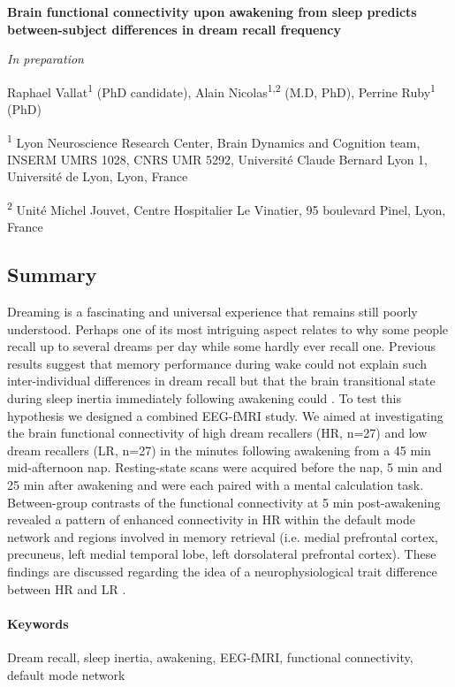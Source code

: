 \cleardoublepage
\textbf{{\large Brain functional connectivity upon awakening from sleep predicts between-subject differences in dream recall frequency}}

\hfill \emph{In preparation}

\bigskip

Raphael Vallat\textsuperscript{1} (PhD candidate), Alain Nicolas\textsuperscript{1,2} (M.D, PhD), Perrine Ruby\textsuperscript{1} (PhD)

\textsuperscript{1} Lyon Neuroscience Research Center, Brain Dynamics and Cognition team, INSERM UMRS 1028, CNRS UMR 5292, Université Claude Bernard Lyon 1, Université de Lyon, Lyon, France

\textsuperscript{2} Unité Michel Jouvet, Centre Hospitalier Le Vinatier, 95 boulevard Pinel, Lyon, France

\subsection*{Summary}
\label{res:inertia:drf:summary}

Dreaming is a fascinating and universal experience that remains still poorly understood. Perhaps one of its most intriguing aspect relates to why some people recall up to several dreams per day while some hardly ever recall one. Previous results suggest that memory performance during wake could not explain such inter-individual differences in dream recall but that the brain transitional state during sleep inertia immediately following awakening could . To test this hypothesis we designed a combined EEG-fMRI study. We aimed at investigating the brain functional connectivity of high dream recallers (HR, n=27) and low dream recallers (LR, n=27) in the minutes following awakening from a 45 min mid-afternoon nap. Resting-state scans were acquired before the nap, 5 min and 25 min after awakening and were each paired with a mental calculation task. Between-group contrasts of the functional connectivity at 5 min post-awakening revealed a pattern of enhanced connectivity in HR within the default mode network and regions involved in memory retrieval (i.e. medial prefrontal cortex, precuneus, left medial temporal lobe, left dorsolateral prefrontal cortex). These findings are discussed regarding the idea of a neurophysiological trait difference between HR and LR .

\paragraph{Keywords}
Dream recall, sleep inertia, awakening, EEG-fMRI, functional connectivity, default mode network

